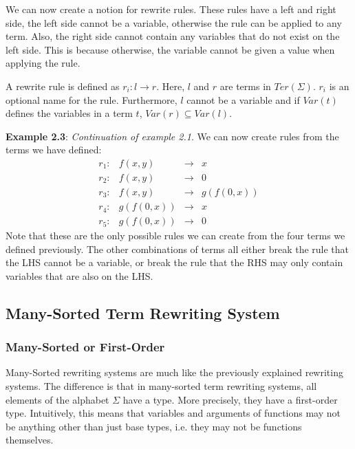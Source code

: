 We can now create a notion for rewrite rules. These rules have a left and right side, the left side cannot be a variable, otherwise the rule can be applied to any term. Also, the right side cannot contain any variables that do not exist on the left side. This is because otherwise, the variable cannot be given a value when applying the rule.
\begin{definition}
A rewrite rule is defined as $r_i : l \rightarrow r$. Here, $l$ and $r$ are terms in $\textit{Ter}(\Sigma)$. $r_i$ is an optional name for the rule. Furthermore, $l$ cannot be a variable and if $\textit{Var}(t)$ defines the variables in a term $t$, $\textit{Var}(r) \subseteq \textit{Var}(l)$. 
\end{definition}

\textbf{Example 2.3}: \textit{Continuation of example 2.1}. We can now create rules from the terms we have defined:\newline
$$
\begin{array}{lrcl}
    r_1: & f(x, y) & \rightarrow & x \\
    r_2: & f(x, y) & \rightarrow & 0 \\
    r_3: & f(x, y) & \rightarrow & g(f(0, x))\\
    r_4: & g(f(0, x)) & \rightarrow & x\\
    r_5: & g(f(0, x)) & \rightarrow & 0
\end{array}
$$
Note that these are the only possible rules we can create from the four terms we defined previously. The other combinations of terms all either break the rule that the LHS cannot be a variable, or break the rule that the RHS may only contain variables that are also on the LHS.

\subsection{Many-Sorted Term Rewriting System}
\subsubsection{Many-Sorted or First-Order}
Many-Sorted rewriting systems are much like the previously explained rewriting systems. The difference is that in many-sorted term rewriting systems, all elements of the alphabet $\Sigma$ have a type. More precisely, they have a first-order type. Intuitively, this means that variables and arguments of functions may not be anything other than just base types, i.e. they may not be functions themselves. 

